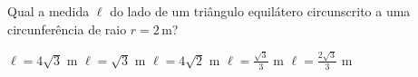 Qual a medida $\ell$ do lado de um triângulo equilátero circunscrito a uma circunferência de raio $r=2$\,m?

$\ell=4\sqrt{3}$ m
$\ell=\sqrt{3}$ m
$\ell=4\sqrt{2}$ m
$\ell=\frac{\sqrt{3}}{3}$ m
$\ell=\frac{2\sqrt{3}}{3}$ m


